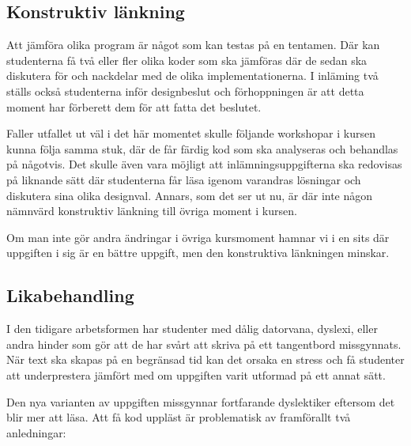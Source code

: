 \documentclass[a4paper, 10pt]{article}
\begin{document}
\subsection{Konstruktiv länkning}

Att jämföra olika program är något som kan 
testas på en tentamen. Där kan studenterna få två 
eller fler olika koder som ska jämföras där 
de sedan ska diskutera för och nackdelar med 
de olika implementationerna. I inläming två 
ställs också studenterna inför designbeslut och 
förhoppningen är att detta moment har förberett 
dem för att fatta det beslutet.

Faller utfallet ut väl i det här momentet skulle 
följande workshopar i kursen kunna följa samma stuk, 
där de får färdig kod som ska analyseras och 
behandlas på någotvis. Det skulle även vara 
möjligt att inlämningsuppgifterna ska redovisas 
på liknande sätt där studenterna får läsa igenom 
varandras lösningar och diskutera sina olika 
designval. Annars, som det ser ut nu, är där 
inte någon nämnvärd konstruktiv länkning till 
övriga moment i kursen.

Om man inte gör andra ändringar i övriga 
kursmoment hamnar vi i en sits där uppgiften i 
sig är en bättre uppgift, men den konstruktiva 
länkningen minskar.

\subsection{Likabehandling}

I den tidigare arbetsformen har studenter med 
dålig datorvana, dyslexi, eller andra hinder 
som gör att de har svårt att skriva på ett 
tangentbord missgynnats. När text ska skapas 
på en begränsad tid kan det orsaka en stress 
och få studenter att underprestera jämfört 
med om uppgiften varit utformad på ett annat 
sätt.

Den nya varianten av uppgiften missgynnar 
fortfarande dyslektiker eftersom det blir mer 
att läsa. Att få kod uppläst är problematisk 
av framförallt två anledningar:
\end{document}

